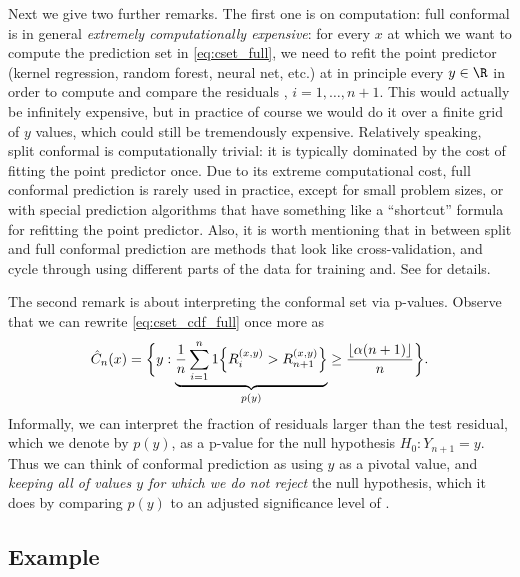 \documentclass{article}
\begin{document}
Next we give two further remarks. The first one is on computation: full
conformal is in general \emph{extremely computationally expensive}: for every
$x$ at which we want to compute the prediction set  in
\eqref{eq:cset_full}, we need to refit the point predictor 
 (kernel regression, random forest, neural net, etc.) at 
in principle every $y \in \R$ in order to compute and compare the residuals
, $i=1,\dots,n+1$. This would actually be infinitely
expensive, but in practice of course we would do it over a finite grid of $y$
values, which could still be tremendously expensive. Relatively speaking, split 
conformal is computationally trivial: it is typically dominated by the cost of
fitting the point predictor  once. Due to its extreme
computational cost, full conformal prediction is rarely used in practice, except
for small problem sizes, or with special prediction algorithms that have
something like a ``shortcut'' formula for refitting the point predictor. 
Also, it is worth mentioning that in between split and full conformal prediction
are methods that look like cross-validation, and cycle through using different
parts of the data for training and. See \citet{barber2021predictive} for
details.   

The second remark is about interpreting the conformal set via p-values. Observe 
that we can rewrite \eqref{eq:cset_cdf_full} once more as
\[
\hat{C}_n(x) = \bigg\{ y : \underbrace{\frac{1}{n} \sum_{i=1}^n 1\Big\{ R_i^{(x,y)} 
  > R^{(x,y)}_{n+1} \Big\}}_{p(y)} \geq \frac{\lfloor \alpha (n+1) \rfloor}{n} 
\bigg\}.  
\]
Informally, we can interpret the fraction of residuals larger than the test
residual, which we denote by $p(y)$, as a p-value for the null hypothesis $H_0: 
Y_{n+1} = y$. Thus we can think of conformal prediction as using $y$ as a
pivotal value, and \emph{keeping all of values $y$ for which we do not reject}
the null hypothesis, which it does by comparing $p(y)$ to an adjusted
significance level of .

\subsection{Example}
\end{document}
